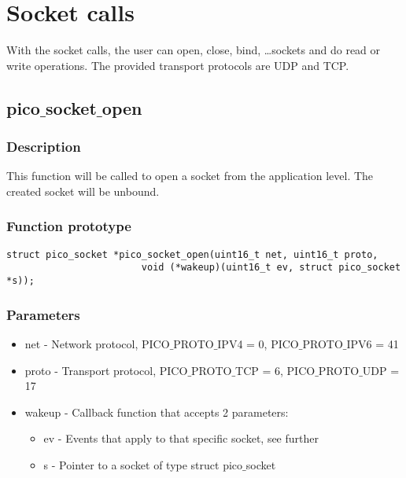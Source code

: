 \section{Socket calls}

With the socket calls, the user can open, close, bind, \ldots sockets and do read
or write operations. The provided transport protocols are UDP and TCP.

\subsection{pico$\_$socket$\_$open}

\subsubsection*{Description}
This function will be called to open a socket from the application level. The created
socket will be unbound.

\subsubsection*{Function prototype}
\begin{verbatim}
struct pico_socket *pico_socket_open(uint16_t net, uint16_t proto,
						void (*wakeup)(uint16_t ev, struct pico_socket *s));
\end{verbatim}

\subsubsection*{Parameters}
\begin{itemize}
\item net - Network protocol, PICO$\_$PROTO$\_$IPV4 = 0, PICO$\_$PROTO$\_$IPV6 = 41
\item proto - Transport protocol, PICO$\_$PROTO$\_$TCP = 6, PICO$\_$PROTO$\_$UDP = 17
\item wakeup - Callback function that accepts 2 parameters:
\begin{itemize}
\item ev - Events that apply to that specific socket, see further
\item s - Pointer to a socket of type struct pico$\_$socket
\end{itemize}
\end{itemize}


